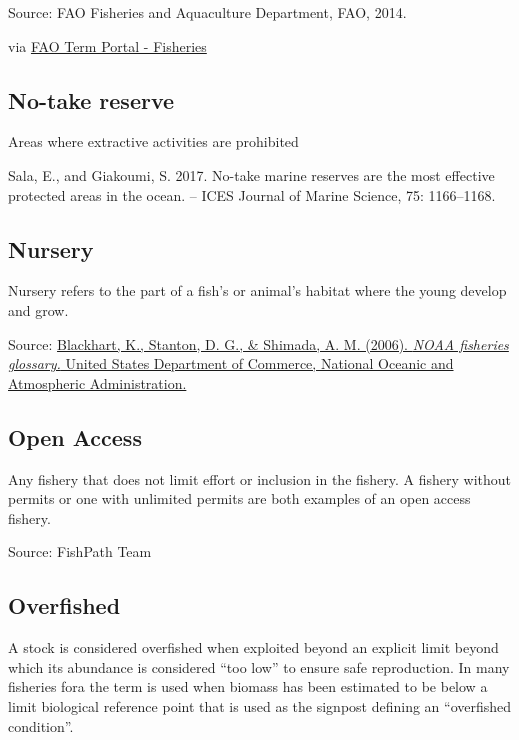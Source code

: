 \documentclass[
  11pt,
]{book}
\begin{document}
Source: FAO Fisheries and Aquaculture Department, FAO, 2014.

via \href{http://www.fao.org/fishery/glossary/en}{FAO Term Portal - Fisheries}

\hypertarget{no-take-reserve}{%
\subsection{No-take reserve}\label{no-take-reserve}}

Areas where extractive activities are prohibited

Sala, E., and Giakoumi, S. 2017. No-take marine reserves are the most effective protected areas in the ocean. -- ICES Journal of Marine Science, 75: 1166--1168.

\hypertarget{nursery}{%
\subsection{Nursery}\label{nursery}}

Nursery refers to the part of a fish's or animal's habitat where the young develop and grow.

Source: \href{https://repository.library.noaa.gov/view/noaa/12856}{Blackhart, K., Stanton, D. G., \& Shimada, A. M. (2006). \emph{NOAA fisheries glossary.} United States Department of Commerce, National Oceanic and Atmospheric Administration.}

\hypertarget{open-access}{%
\subsection{Open Access}\label{open-access}}

Any fishery that does not limit effort or inclusion in the fishery. A fishery without permits or one with unlimited permits are both examples of an open access fishery.

Source: FishPath Team

\hypertarget{overfished}{%
\subsection{Overfished}\label{overfished}}

A stock is considered overfished when exploited beyond an explicit limit beyond which its abundance is considered ``too low'' to ensure safe reproduction. In many fisheries fora the term is used when biomass has been estimated to be below a limit biological reference point that is used as the signpost defining an ``overfished condition''.
\end{document}
